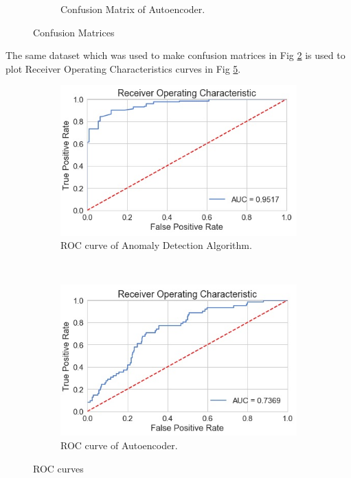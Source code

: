 \documentclass[conference]{IEEEtran}
\begin{document}
\begin{figure}[H]
\begin{subfigure}[h]{0.3\textwidth}
		\caption{Confusion Matrix of Autoencoder.}
		\label{fig:boat2}
	\end{subfigure}
	\caption{Confusion Matrices}
	\label{fig:conf}
\end{figure}

The same dataset which was used to make confusion matrices in Fig \ref{fig:conf} is used to plot Receiver Operating Characteristics curves in Fig \ref{fig:ROC}.



\begin{figure}[H]
	\begin{subfigure}[h]{0.3\textwidth}
		\includegraphics[width=\textwidth]{roc_anomaly.jpg}
		\caption{ROC curve of Anomaly Detection Algorithm.}
		\label{fig:gull}
	\end{subfigure}
	~ %
	\begin{subfigure}[h]{0.3\textwidth}
		\includegraphics[width=\textwidth]{roc_autoencoder.jpg}
		\caption{ROC curve of Autoencoder.}
		\label{fig:tiger}
	\end{subfigure}
	\caption{ROC curves}
	\label{fig:ROC}
	
\end{figure}
\end{document}
